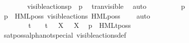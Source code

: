 \begin{isabellebody}
\ \ \ \ \ \ \isamarkupfalse%
\ {\isacartoucheopen}{\isasymtheta}{\isacharbrackleft}{\kern0pt}visible{\isacharunderscore}{\kern0pt}actions{\isacharbrackright}{\kern0pt}{\isacharparenleft}{\kern0pt}p{\isacharparenright}{\kern0pt}\ {\isasymlongmapsto}\isactrlsup {\isasymtheta}{\isasymalpha}\ {\isasymtheta}{\isacharparenleft}{\kern0pt}p{\isacharprime}{\kern0pt}{\isacharparenright}{\kern0pt}{\isacartoucheclose}\ \isamarkupfalse%
\ tran{\isacharunderscore}{\kern0pt}visible\ \isamarkupfalse%
\ auto\isanewline
\ \ \ \ \ \ \isamarkupfalse%
\ \isamarkupfalse%
\ {\isacartoucheopen}{\isasymtheta}{\isacharparenleft}{\kern0pt}p{\isacharprime}{\kern0pt}{\isacharparenright}{\kern0pt}\ {\isasymTurnstile}\ {\isasymsigma}{\isacharparenleft}{\kern0pt}{\isasymphi}{\isacharparenright}{\kern0pt}{\isacartoucheclose}\ \isanewline
\ \ \ \ \ \ \isamarkupfalse%
\ \isamarkupfalse%
\ {\isacartoucheopen}{\isasymtheta}{\isacharparenleft}{\kern0pt}p{\isacharparenright}{\kern0pt}\ {\isasymTurnstile}\ HML{\isacharunderscore}{\kern0pt}poss\ {\isacharparenleft}{\kern0pt}{\isasymepsilon}{\isacharbrackleft}{\kern0pt}visible{\isacharunderscore}{\kern0pt}actions{\isacharbrackright}{\kern0pt}{\isacharparenright}{\kern0pt}\ {\isacharparenleft}{\kern0pt}HML{\isacharunderscore}{\kern0pt}poss\ {\isasymalpha}\ {\isasymsigma}{\isacharparenleft}{\kern0pt}{\isasymphi}{\isacharparenright}{\kern0pt}{\isacharparenright}{\kern0pt}{\isacartoucheclose}\ \isamarkupfalse%
\ auto\isanewline
\ \ \ \ \ \ \isamarkupfalse%
\ \ {\isacartoucheopen}{\isasymalpha}\ {\isasymnoteq}\ {\isasymtau}\ {\isasymand}\ {\isasymalpha}\ {\isasymnoteq}\ t\ {\isasymand}\ {\isasymalpha}\ {\isasymnoteq}\ t{\isacharunderscore}{\kern0pt}{\isasymepsilon}\ {\isasymand}\ {\isacharparenleft}{\kern0pt}{\isasymforall}\ X{\isachardot}{\kern0pt}\ {\isasymalpha}\ {\isasymnoteq}\ {\isasymepsilon}{\isacharbrackleft}{\kern0pt}X{\isacharbrackright}{\kern0pt}{\isacharparenright}{\kern0pt}{\isacartoucheclose}\ \isamarkupfalse%
\ {\isacartoucheopen}{\isasymtheta}{\isacharparenleft}{\kern0pt}p{\isacharparenright}{\kern0pt}\ {\isasymTurnstile}\ {\isasymsigma}{\isacharparenleft}{\kern0pt}HMLt{\isacharunderscore}{\kern0pt}poss\ {\isasymalpha}\ {\isasymphi}{\isacharparenright}{\kern0pt}{\isacartoucheclose}\isanewline
\ \ \ \ \ \ \ \ \isamarkupfalse%
\ sat{\isacharunderscore}{\kern0pt}poss{\isacharunderscore}{\kern0pt}alpha{\isacharunderscore}{\kern0pt}not{\isacharunderscore}{\kern0pt}special\ visible{\isacharunderscore}{\kern0pt}actions{\isacharunderscore}{\kern0pt}def\ \isamarkupfalse%

\end{isabellebody}
